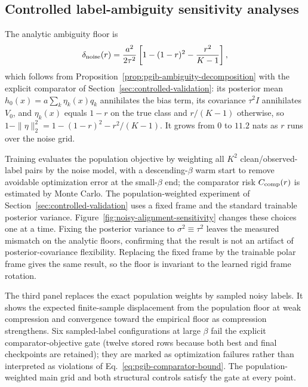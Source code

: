 \subsection{Controlled label-ambiguity sensitivity analyses}
\label{app:noisy-alignment-sensitivity}

The analytic ambiguity floor is
\begin{equation}
\delta_{\rm noise}(r)=\frac{a^2}{2\tau^2}
\left[1-(1-r)^2-\frac{r^2}{K-1}\right],
\label{eq:synthetic-noise-floor}
\end{equation}
which follows from Proposition~\ref{prop:pgib-ambiguity-decomposition} with the
explicit comparator of Section~\ref{sec:controlled-validation}: its posterior mean
$h_0(x)=a\sum_k\eta_k(x)q_k$ annihilates the bias term, its covariance $\tau^2I$
annihilates $V_0$, and $\eta_k(x)$ equals $1-r$ on the true class and $r/(K-1)$
otherwise, so $1-\|\eta\|_2^2=1-(1-r)^2-r^2/(K-1)$. It grows from $0$ to $11.2$
nats as $r$ runs over the noise grid.

Training evaluates the population objective by weighting all $K^2$
clean/observed-label pairs by the noise model, with a descending-$\beta$ warm start
to remove avoidable optimization error at the small-$\beta$ end; the comparator risk
$C_{\rm comp}(r)$ is estimated by Monte Carlo. The population-weighted experiment of
Section~\ref{sec:controlled-validation} uses a fixed frame and the standard trainable
posterior variance. Figure~\ref{fig:noisy-alignment-sensitivity} changes these
choices one at a time. Fixing the posterior variance to
$\sigma^2\equiv\tau^2$ leaves the measured mismatch on the analytic floors, confirming
that the result is not an artifact of posterior-covariance flexibility. Replacing the
fixed frame by the trainable polar frame gives the same result, so the floor
is invariant to the learned rigid frame rotation.

The third panel replaces the exact population weights by sampled noisy labels. It
shows the expected finite-sample displacement from the population floor at weak
compression and convergence toward the empirical floor as compression strengthens.
Six sampled-label configurations at large $\beta$ fail the explicit comparator-objective
gate (twelve stored rows because both best and final checkpoints are retained); they are
marked as optimization failures rather than interpreted as violations of
Eq.~\eqref{eq:pgib-comparator-bound}. The population-weighted main grid and both
structural controls satisfy the gate at every point.

